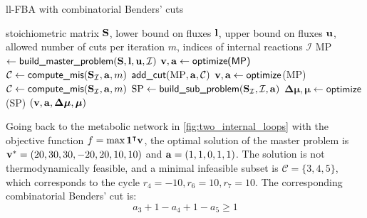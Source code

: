 \begin{algorithm}
    \caption{ll-FBA with combinatorial Benders' cuts}\label{alg:CB}
    \begin{algorithmic}[1]
        \Require stoichiometric matrix $\bold S$, lower bound on fluxes $\bold l$, upper bound on fluxes $\bold u$, allowed number of cuts per iteration $m$, indices of internal reactions $\mathcal{I}$
        \State MP $\gets \textsf{build\_master\_problem}(\bold S, \bold l, \bold u, \mathcal{I})$
        \State $\bold{v, a} \gets \textsf{optimize(MP)}$ 
        \State $\mathcal{C} \gets \textsf{compute\_mis}(\bold S_\mathcal{I}, \bold a, m)$ 
            \State $\textsf{add\_cut}(\text{MP}, \bold a, \mathcal{C})$ 
            \State $\bold v, \bold a \gets \textsf{optimize}$(MP)
            \State $\mathcal{C} \gets \textsf{compute\_mis}(\bold S_\mathcal{I}, \bold a, m)$
        \EndWhile
        \State $\text{SP} \gets \textsf{build\_sub\_problem}(\bold S_\mathcal{I}, \mathcal{I}, \bold a)$
        \State $\boldsymbol{\Delta \mu}, \boldsymbol \mu \gets \textsf{optimize}$(SP)
    \State \Return $(\bold v, \bold a, \boldsymbol{\Delta \mu}, \boldsymbol \mu)$ 
    \end{algorithmic}
\end{algorithm}

Going back to the metabolic network in \cref{fig:two_internal_loops}
with the objective function $f = \text{max} \, \bold 1^\intercal \bold v$, the optimal solution of the master problem is $\bold v^* = (20, 30, 30, -20, 20, 10, 10)$ and $\bold a = (1,1,0,1,1)$. 
The solution is not thermodynamically feasible, and a minimal infeasible subset is $\mathcal{C} = \{3, 4, 5\}$, which corresponds to the cycle $r_4=-10, r_6=10, r_7=10$. 
The corresponding combinatorial Benders' cut is:
\begin{equation*}
    a_3 + 1 - a_4 + 1 - a_5 \geq 1
\end{equation*}

